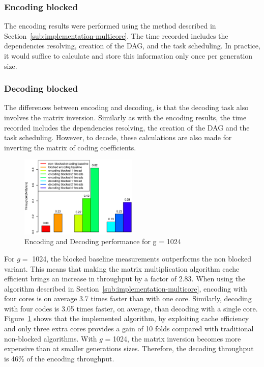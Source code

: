 \subsubsection{Encoding blocked}
The encoding results were performed using the
method described in Section~\ref{sub:implementation-multicore}. The time
recorded includes the dependencies resolving, creation of the \ac{DAG}, and
the task scheduling. In practice, it would suffice to calculate and store this
information only once per generation size.

\subsubsection{Decoding blocked}
The differences between encoding and decoding, is that the decoding task also
involves the matrix inversion. Similarly as with the encoding results, the
time recorded includes the dependencies resolving, the creation of the
\ac{DAG} and the task scheduling. However, to decode, these calculations are also made for inverting the matrix of coding coefficients.

\begin{figure}[ht!]
\centering
\includegraphics[width=0.5\textwidth]{images/2015-04-18_encoding_decoding_1024.eps}
\caption{Encoding and Decoding performance for g = 1024 \cite{wunderlich2015network}}
\label{enc_dec1024}
\end{figure}

For $g=$ 1024, the blocked baseline measurements outperforms the non blocked
variant. This means that making the matrix multiplication algorithm cache
efficient brings an increase in throughput by a factor of 2.83. When using the
algorithm described in Section~\ref{sub:implementation-multicore}, encoding with
four cores is on average 3.7 times faster than with one core. Similarly,
decoding with four codes is 3.05 times faster, on average, than decoding with a
single core. Figure~\ref{enc_dec1024} shows that the implemented algorithm, by
exploiting cache efficiency and only three extra cores provides a gain of 10
folds compared with traditional non-blocked algorithms. With $g$ = 1024, the
matrix inversion becomes more expensive than at smaller generations sizes.
Therefore, the decoding throughput is 46\% of the encoding throughput.

